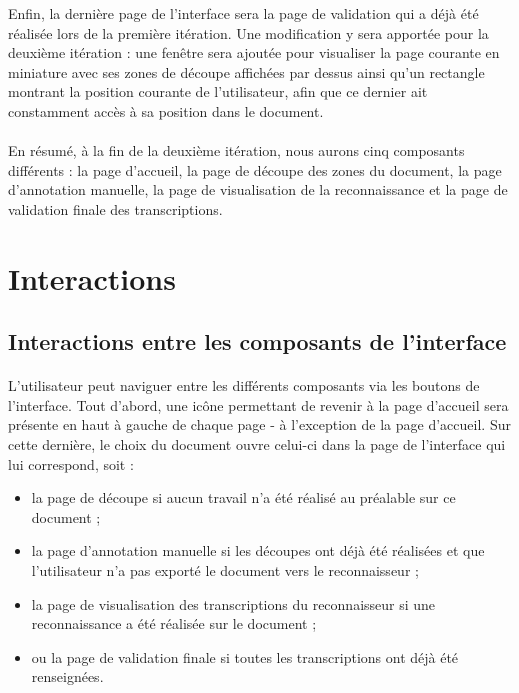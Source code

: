 
Enfin, la dernière page de l’interface sera la page de validation qui a déjà été réalisée lors de la première itération. Une modification y sera apportée pour la deuxième itération : une fenêtre sera ajoutée pour visualiser la page courante en miniature avec ses zones de découpe affichées par dessus ainsi qu’un rectangle montrant la position courante de l’utilisateur, afin que ce dernier ait constamment accès à sa position dans le document.


\paragraph{}
En résumé, à la fin de la deuxième itération, nous aurons cinq composants différents : la page d’accueil, la page de découpe des zones du document, la page d’annotation manuelle, la page de visualisation de la reconnaissance et la page de validation finale des transcriptions.


\section{Interactions}

\subsection{Interactions entre les composants de l'interface}

\paragraph{}
L’utilisateur peut naviguer entre les différents composants via les boutons de l’interface.
Tout d’abord, une icône permettant de revenir à la page d’accueil sera présente en haut à gauche de chaque page - à l’exception de la page d’accueil. Sur cette dernière, le choix du document ouvre celui-ci dans la page de l’interface qui lui correspond, soit :

\begin{itemize}
\item la page de découpe si aucun travail n’a été réalisé au préalable sur ce document ;
\item la page d’annotation manuelle si les découpes ont déjà été réalisées et que l’utilisateur n’a pas exporté le document vers le reconnaisseur ;
\item la page de visualisation des transcriptions du reconnaisseur si une reconnaissance a été réalisée sur le document ;
\item ou la page de validation finale si toutes les transcriptions ont déjà été renseignées.
\end{itemize}

